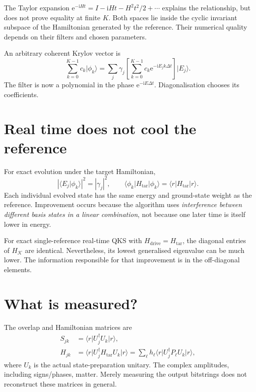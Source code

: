 \documentclass[11pt,a4paper,oneside]{report}
\newcommand{\ket}[1]{\lvert #1\rangle}
\newcommand{\bra}[1]{\langle #1\rvert}
\newcommand{\braket}[2]{\langle #1\vert #2\rangle}
\newcommand{\abs}[1]{\left\lvert #1\right\rvert}
\newcommand{\Ht}{H_{\mathrm{tar}}}
\newcommand{\Hd}{H_{\mathrm{drive}}}
\newcommand{\HK}{H_{\mathcal K}}
\newcommand{\I}{\mathrm i}
\newcommand{\e}{\mathrm e}
\begin{document}
The Taylor expansion $\e^{-\I Ht}=I-\I Ht-H^2t^2/2+\cdots$ explains the relationship, but does not prove equality at finite $K$. Both spaces lie inside the cyclic invariant subspace of the Hamiltonian generated by the reference. Their numerical quality depends on their filters and chosen parameters.

An arbitrary coherent Krylov vector is
\begin{equation}
\sum_{k=0}^{K-1}c_k\ket{\phi_k}
=\sum_j\gamma_j\left[\sum_{k=0}^{K-1}c_k\e^{-\I E_jk\Delta t}\right]\ket{E_j}.
\end{equation}
The filter is now a polynomial in the phase $\e^{-\I E\Delta t}$. Diagonalisation chooses its coefficients.

\section{Real time does not cool the reference}
For exact evolution under the target Hamiltonian,
\begin{equation}
\abs{\braket{E_j}{\phi_k}}^2=\abs{\gamma_j}^2,\qquad
\bra{\phi_k}\Ht\ket{\phi_k}=\bra r\Ht\ket r.
\end{equation}
Each individual evolved state has the same energy and ground-state weight as the reference. Improvement occurs because the algorithm uses \emph{interference between different basis states in a linear combination}, not because one later time is itself lower in energy.

\begin{idea}
For exact single-reference real-time QKS with $\Hd=\Ht$, the diagonal entries of $\HK$ are identical. Nevertheless, its lowest generalised eigenvalue can be much lower. The information responsible for that improvement is in the off-diagonal elements.
\end{idea}

\section{What is measured?}
The overlap and Hamiltonian matrices are
\begin{align}
S_{jk}&=\bra r U_j^\dagger U_k\ket r,\\
H_{jk}&=\bra r U_j^\dagger\Ht U_k\ket r
=\sum_\ell h_\ell\bra r U_j^\dagger P_\ell U_k\ket r,
\end{align}
where $U_k$ is the actual state-preparation unitary. The complex amplitudes, including signs/phases, matter. Merely measuring the output bitstrings does not reconstruct these matrices in general.
\end{document}
